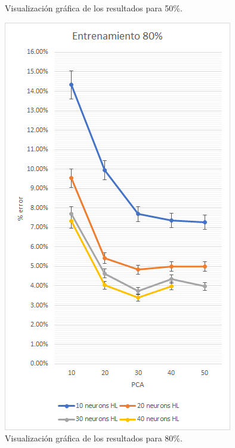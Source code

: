 \documentclass[a4paper]{article}
\begin{document}
\begin{figure}[!h]
\begin{adjustwidth}{-70pt}{-70pt}
\begin{minipage}[b]{0.65\textwidth}
	    \caption{{\footnotesize Visualización gráfica de los resultados para 50\%.}}
	  \end{minipage}
	  \hfill
	  \begin{minipage}[b]{0.65\textwidth}
	    \includegraphics[width=\textwidth]{3_80_graph}
	    \caption{{\footnotesize Visualización gráfica de los resultados para 80\%.}}
	  \end{minipage}
	  \end{adjustwidth}
\end{figure}
\end{document}
